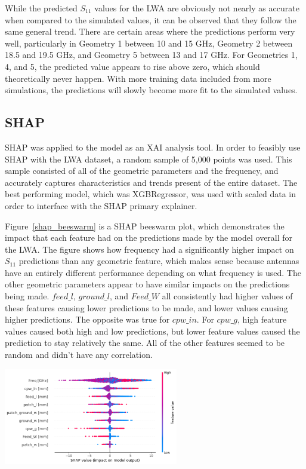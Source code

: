 \documentclass[conference]{IEEEtran}
\newenvironment{Figure}
    {\par\medskip\noindent\minipage{\linewidth}}
    {\endminipage\par\medskip}
\begin{document}
While the predicted $S_{11}$ values for the LWA are obviously not nearly as accurate when compared to the simulated values, it can be observed that they follow the same general trend. There are certain areas where the predictions perform very well, particularly in Geometry 1 between 10 and 15 GHz, Geometry 2 between 18.5 and 19.5 GHz, and Geometry 5 between 13 and 17 GHz. For Geometries 1, 4, and 5, the predicted value appears to rise above zero, which should theoretically never happen. With more training data included from more simulations, the predictions will slowly become more fit to the simulated values. 


\subsection{SHAP}
\label{sec:xai}
SHAP was applied to the model as an XAI analysis tool. In order to feasibly use SHAP with the LWA dataset, a random sample of 5,000 points was used. This sample consisted of all of the geometric parameters and the frequency, and accurately captures characteristics and trends present of the entire dataset. The best performing model, which was XGBRegressor, was used with scaled data in order to interface with the SHAP primary explainer. 

Figure~\ref{shap_beeswarm} is a SHAP beeswarm plot, which demonstrates the impact that each feature had on the predictions made by the model overall for the LWA. The figure shows how frequency had a significantly higher impact on $S_{11}$ predictions than any geometric feature, which makes sense because antennas have an entirely different performance depending on what frequency is used. The other geometric parameters appear to have similar impacts on the predictions being made. $feed\_l$, $ground\_l$, and $Feed\_W$ all consistently had higher values of these features causing lower predictions to be made, and lower values causing higher predictions. The opposite was true for $cpw\_in$. For $cpw\_g$, high feature values caused both high and low predictions, but lower feature values caused the prediction to stay relatively the same. All of the other features seemed to be random and didn't have any correlation. 

    
\begin{Figure}
\centering
\includegraphics[width=3in]{shap_beeswarm}
\label{shap_beeswarm}
\end{Figure}
\end{document}
